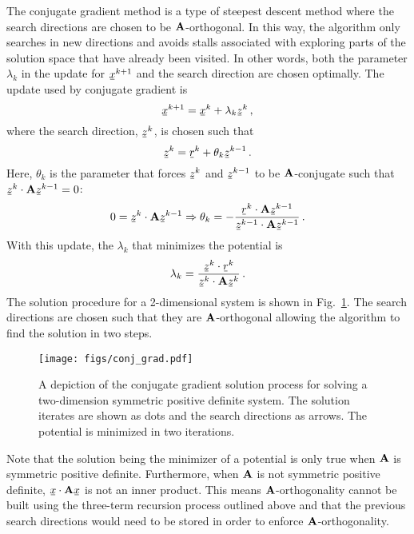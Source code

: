 \documentclass[../doc.tex]{subfiles}
\begin{document}
The conjugate gradient method is a type of steepest descent method where the search directions are chosen to be $\boldsymbol{\mathrm{A}}$-orthogonal. In this way, the algorithm only searches in new directions and avoids stalls associated with exploring parts of the solution space that have already been visited. In other words, both the parameter $\lambda_k$ in the update for $\ubar{x}^{k+1}$ and the search direction are chosen optimally. The update used by conjugate gradient is 
	\begin{equation}
		\ubar{x}^{k+1} = \ubar{x}^k + \lambda_k \ubar{z}^k \,, 
	\end{equation}
where the search direction, $\ubar{z}^k$, is chosen such that 
	\begin{equation}
		\ubar{z}^k = \ubar{r}^k + \theta_k \ubar{z}^{k-1} \,. 
	\end{equation}
Here, $\theta_k$ is the parameter that forces $\ubar{z}^{k}$ and $\ubar{z}^{k-1}$ to be $\boldsymbol{\mathrm{A}}$-conjugate such that $\ubar{z}^k \cdot \mat{A} \ubar{z}^{k-1} = 0$: 
	\begin{equation}
		0 = \ubar{z}^k \cdot \mat{A} \ubar{z}^{k-1} \Rightarrow \theta_k = -\frac{\ubar{r}^k\cdot \mat{A} \ubar{z}^{k-1}}{\ubar{z}^{k-1} \cdot \mat{A} \ubar{z}^{k-1}} \,. 
	\end{equation}
With this update, the $\lambda_k$ that minimizes the potential is 
	\begin{equation}
		\lambda_k = \frac{\ubar{z}^k \cdot \ubar{r}^k}{\ubar{z}^k \cdot \mat{A} \ubar{z}^k} \,. 
	\end{equation}
The solution procedure for a 2-dimensional system is shown in Fig.~\ref{fem:conj_grad_diag}. The search directions are chosen such that they are $\boldsymbol{\mathrm{A}}$-orthogonal allowing the algorithm to find the solution in two steps. 
\begin{figure}
\centering
\texttt{[image: figs/conj\_grad.pdf]}
\caption{A depiction of the conjugate gradient solution process for solving a two-dimension symmetric positive definite system. The solution iterates are shown as dots and the search directions as arrows. The potential is minimized in two iterations.}
\label{fem:conj_grad_diag}
\end{figure}

Note that the solution being the minimizer of a potential is only true when $\boldsymbol{\mathrm{A}}$ is symmetric positive definite. Furthermore, when $\boldsymbol{\mathrm{A}}$ is not symmetric positive definite, $\ubar{x}\cdot\mat{A}\ubar{x}$ is not an inner product. This means $\boldsymbol{\mathrm{A}}$-orthogonality cannot be built using the three-term recursion process outlined above and that the previous search directions would need to be stored in order to enforce $\boldsymbol{\mathrm{A}}$-orthogonality. 
\end{document}
